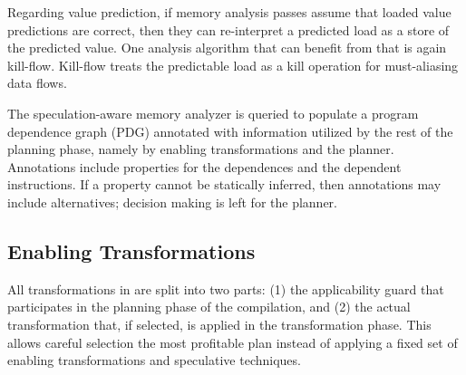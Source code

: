 
Regarding value prediction, if memory analysis passes assume that
loaded value predictions are correct, then they can re-interpret a
predicted load as a store of the predicted value. One analysis
algorithm that can benefit from that is again kill-flow. Kill-flow
treats the predictable load as a kill operation for must-aliasing data
flows.


The speculation-aware memory analyzer is queried to populate a program
dependence graph (PDG) annotated with information utilized by the rest
of the planning phase, namely by enabling transformations and the
planner. Annotations include properties for the dependences and the
dependent instructions.
If a property cannot be statically inferred, then annotations may
include alternatives; decision making is left for the planner.


\subsection{Enabling Transformations}
\label{enablers}

%
All transformations in \name are split into two parts: (1) the applicability guard
that participates in the planning phase of the compilation, and (2) the
actual transformation that, if selected, is applied in the
transformation phase.
This allows careful selection the most profitable plan instead of
applying a fixed
set of enabling transformations and speculative techniques.

